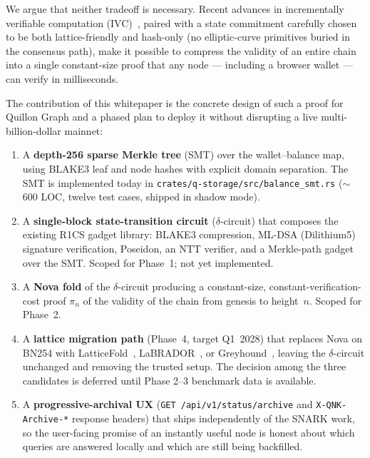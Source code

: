 \documentclass[11pt,a4paper]{article}
\begin{document}
We argue that neither tradeoff is necessary. Recent advances in incrementally
verifiable computation (IVC)~\cite{Valiant2008,KothapalliSettyTzialla2021}, paired
with a state commitment carefully chosen to be both lattice-friendly and
hash-only (no elliptic-curve primitives buried in the consensus path),
make it possible to compress the validity of an entire chain into a single
constant-size proof that any node --- including a browser wallet --- can verify in
milliseconds.

The contribution of this whitepaper is the concrete design of such a proof for
Quillon Graph and a phased plan to deploy it without disrupting a live
multi-billion-dollar mainnet:

\begin{enumerate}[label=(\arabic*),leftmargin=*]
  \item A \textbf{depth-256 sparse Merkle tree} (SMT) over the wallet--balance map,
        using BLAKE3 leaf and node hashes with explicit domain separation. The SMT
        is implemented today in \texttt{crates/q-storage/src/balance\_smt.rs}
        ($\sim$600 LOC, twelve test cases, shipped in shadow mode).
  \item A \textbf{single-block state-transition circuit} ($\delta$-circuit) that
        composes the existing R1CS gadget library:
        BLAKE3 compression, ML-DSA (Dilithium5) signature
        verification, Poseidon, an NTT verifier, and a Merkle-path gadget over the SMT.
        Scoped for Phase~1; not yet implemented.
  \item A \textbf{Nova fold} of the $\delta$-circuit producing a constant-size,
        constant-verification-cost proof $\pi_n$ of the validity of the chain
        from genesis to height~$n$. Scoped for Phase~2.
  \item A \textbf{lattice migration path} (Phase~4, target Q1~2028) that
        replaces Nova on BN254 with LatticeFold~\cite{BonehChenTairi2024LatticeFold},
        LaBRADOR~\cite{BeullensSeiler2023LaBRADOR}, or
        Greyhound~\cite{NguyenSeiler2024Greyhound}, leaving the
        $\delta$-circuit unchanged and removing the trusted setup. The decision
        among the three candidates is deferred until Phase 2--3 benchmark data
        is available.
  \item A \textbf{progressive-archival UX} (\texttt{GET /api/v1/status/archive}
        and \texttt{X-QNK-Archive-*} response headers) that ships independently
        of the SNARK work, so the user-facing promise of an instantly useful
        node is honest about which queries are answered locally and which are
        still being backfilled.
\end{enumerate}
\end{document}
